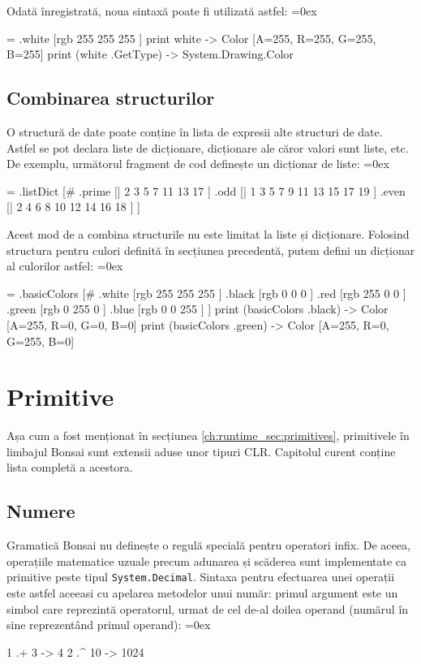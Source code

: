 \documentclass[12pt,a4paper]{memoir}
\renewcommand{\c}{\texttt}
\newenvironment{code}
{
\definecolor{shadecolor}{gray}{0.91}
\topsep=0ex
\relax
\shaded
\verbatim
}
{
\endverbatim
\endshaded
}
\begin{document}
Odată înregistrată, noua sintaxă poate fi utilizată astfel:
\begin{code}
= .white [rgb 255 255 255 ]
print white
  -> Color [A=255, R=255, G=255, B=255]
print (white .GetType)
  -> System.Drawing.Color
\end{code}

\section{Combinarea structurilor}

O structură de date poate conține în lista de expresii alte structuri de date. Astfel se pot declara liste de dicționare, dicționare ale căror valori sunt liste, etc. De exemplu, următorul fragment de cod definește un dicționar de liste:
\begin{code}
= .listDict [#
  .prime [| 2 3 5 7 11 13 17 ]
  .odd [| 1 3 5 7 9 11 13 15 17 19 ]
  .even [| 2 4 6 8 10 12 14 16 18 ]
]
\end{code}

Acest mod de a combina structurile nu este limitat la liste și dicționare. Folosind structura pentru culori definită în secțiunea precedentă, putem defini un dicționar al culorilor astfel:
\begin{code}
= .basicColors [#
  .white [rgb 255 255 255 ]
  .black [rgb 0 0 0 ]
  .red [rgb 255 0 0 ]
  .green [rgb 0 255 0 ]
  .blue [rgb 0 0 255 ]
]
print (basicColors .black)
  -> Color [A=255, R=0, G=0, B=0]
print (basicColors .green)
  -> Color [A=255, R=0, G=255, B=0]
\end{code}

\chapter{Primitive}\label{ch:Primitives}

Așa cum a fost menționat în secțiunea \ref{ch:runtime_sec:primitives}, primitivele în limbajul Bonsai sunt extensii aduse unor tipuri CLR. Capitolul curent conține lista completă a acestora.

\section{Numere}

Gramatică Bonsai nu definește o regulă specială pentru operatori infix. De aceea, operațiile matematice uzuale precum adunarea și scăderea sunt implementate ca primitive peste tipul \c{System.Decimal}. Sintaxa pentru efectuarea unei operații este astfel aceeasi cu apelarea metodelor unui număr: primul argument este un simbol care reprezintă operatorul, urmat de cel de-al doilea operand (numărul în sine reprezentând primul operand):
\begin{code}
1 .+ 3 
  -> 4
2 .^ 10
  -> 1024
\end{code}
\end{document}
